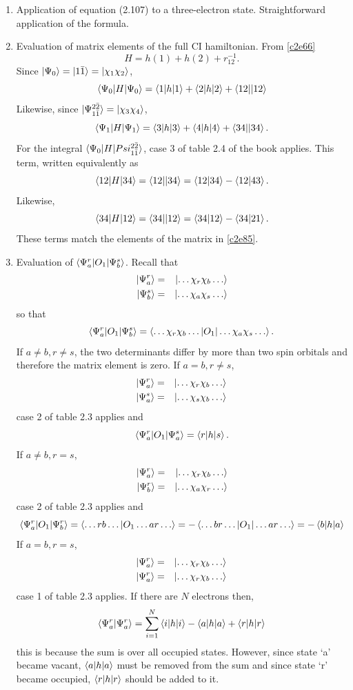 \begin{enumerate}
\item\label{c2p11} Application of equation (2.107) to a three-electron state.
Straightforward application of the formula.

\item\label{c2p12} Evaluation of matrix elements of the full CI hamiltonian.
From \eqref{c2e66}
\[
H = h(1) + h(2) + r_{12}^{-1}.
\]
Since $\ket{\Psi_0} = \ket{1\bar{1}} = \ket{\chi_1\chi_2}$,
\[
\braket{\Psi_0|H|\Psi_0} = \braket{1|h|1} + \braket{2|h|2} + \braket{12||12}
\]
Likewise, since $\ket{\Psi_{1\bar{1}}^{2\bar{2}}} = \ket{\chi_3\chi_4}$,
\[
\braket{\Psi_1|H|\Psi_1} = \braket{3|h|3} + \braket{4|h|4} + \braket{34||34}.
\]
For the integral $\braket{\Psi_0|H|Psi_{1\bar{1}}^{2\bar{2}}}$, case 3 of table
2.4 of the book applies. This term, written equivalently as
\[
\braket{12|H|34} = \braket{12||34} = \braket{12|34} - \braket{12|43}.
\]
Likewise,
\[
\braket{34|H|12} = \braket{34||12} = \braket{34|12} - \braket{34|21}.
\]
These terms match the elements of the matrix in \eqref{c2e85}.

\item\label{c2p13} Evaluation of $\braket{\Psi_a^r|O_1|\Psi_b^s}$.
Recall that 
\begin{eqnarray*}
\ket{\Psi_a^r} &=& \ket{\ldots\chi_r\chi_b\ldots} \\
\ket{\Psi_b^s} &=& \ket{\ldots\chi_a\chi_s\ldots}
\end{eqnarray*}
so that
\[
\braket{\Psi_a^r|O_1|\Psi_b^s} = 
\braket{\ldots\chi_r\chi_b\ldots|O_1|\ldots\chi_a\chi_s\ldots}.
\]
If $a \ne b, r \ne s$, the two determinants differ by more than two spin 
orbitals and therefore the matrix element is zero.
If $a = b, r \ne s$, 
\begin{eqnarray*}
\ket{\Psi_a^r} &=& \ket{\ldots\chi_r\chi_b\ldots} \\
\ket{\Psi_a^s} &=& \ket{\ldots\chi_s\chi_b\ldots}
\end{eqnarray*}
case 2 of table 2.3 applies and
\[
\braket{\Psi_a^r|O_1|\Psi_a^s} = \braket{r|h|s}.
\]
If $a \ne b, r = s$,
\begin{eqnarray*}
\ket{\Psi_a^r} &=& \ket{\ldots\chi_r\chi_b\ldots} \\
\ket{\Psi_b^r} &=& \ket{\ldots\chi_a\chi_r\ldots}
\end{eqnarray*}
case 2 of table 2.3 applies and
\[
\braket{\Psi_a^r|O_1|\Psi_b^r} = \braket{\ldots rb \ldots|O_1\ldots ar \ldots}
= -\braket{\ldots br \ldots|O_1|\ldots ar \ldots} = -\braket{b|h|a}
\]
If $a = b, r = s$,
\begin{eqnarray*}
\ket{\Psi_a^r} &=& \ket{\ldots\chi_r\chi_b\ldots} \\
\ket{\Psi_a^r} &=& \ket{\ldots\chi_r\chi_b\ldots}
\end{eqnarray*}
case 1 of table 2.3 applies. If there are $N$ electrons then,
\[
\braket{\Psi_a^r|\Psi_a^r} = \sum_{i=1}^N\braket{i|h|i} - \braket{a|h|a} +
\braket{r|h|r}
\]
this is because the sum is over all occupied states. However, since state `a'
became vacant, $\braket{a|h|a}$ must be removed from the sum and since state
`r' became occupied, $\braket{r|h|r}$ should be added to it.


\end{enumerate}
